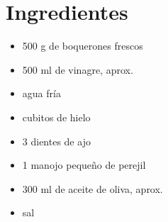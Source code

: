 

    \begin{minipage}[t]{0.35\textwidth}
        \section*{Ingredientes}
        \begin{itemize}[leftmargin=*]
            \item 500 g de boquerones frescos
            \item 500 ml de vinagre, aprox.
            \item agua fría
            \item cubitos de hielo
            \item 3 dientes de ajo
            \item 1 manojo pequeño de perejil
            \item 300 ml de aceite de oliva, aprox.
            \item sal
        \end{itemize}
    \end{minipage}
    \hfill
